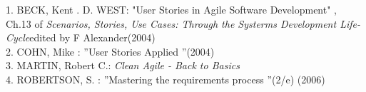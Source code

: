 1. BECK, Kent . D. WEST: "User Stories in Agile Software Development" ,
Ch.13 of \emph{Scenarios, Stories, Use Cases: Through the Systerms
Development Life-Cycle}edited by F Alexander(2004)\\
2. COHN, Mike : ''User Stories Applied ''(2004)\\
3. MARTIN, Robert C.: \emph{Clean Agile - Back to Basics}\\
4. ROBERTSON, S. : ''Mastering the requirements process ''(2/e) (2006)\\



